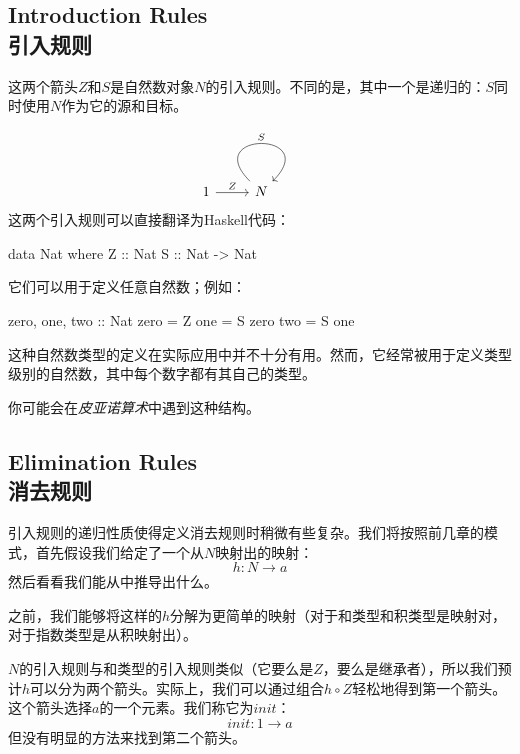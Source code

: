 \documentclass[DaoFP]{subfiles}
\begin{document}
    \subsection{Introduction Rules\\引入规则}

    这两个箭头$Z$和$S$是自然数对象$N$的引入规则。不同的是，其中一个是递归的：$S$同时使用$N$作为它的源和目标。

    \[
        \begin{tikzcd}
            1
            \arrow[r, "Z"]
            &N
            \arrow[out=135, in=45, loop, "S"]
        \end{tikzcd}
    \]
    这两个引入规则可以直接翻译为Haskell代码：

    \begin{haskell}
        data Nat where
        Z :: Nat
        S :: Nat -> Nat
    \end{haskell}
    它们可以用于定义任意自然数；例如：

    \begin{haskell}
        zero, one, two :: Nat
        zero = Z
        one  = S zero
        two  = S one
    \end{haskell}

    这种自然数类型的定义在实际应用中并不十分有用。然而，它经常被用于定义类型级别的自然数，其中每个数字都有其自己的类型。

    你可能会在\emph{皮亚诺算术}中遇到这种结构。

    \subsection{Elimination Rules\\消去规则}

    引入规则的递归性质使得定义消去规则时稍微有些复杂。我们将按照前几章的模式，首先假设我们给定了一个从$N$映射出的映射：
    \[ h \colon N \to a \]
    然后看看我们能从中推导出什么。

    之前，我们能够将这样的$h$分解为更简单的映射（对于和类型和积类型是映射对，对于指数类型是从积映射出）。

    $N$的引入规则与和类型的引入规则类似（它要么是$Z$，要么是继承者），所以我们预计$h$可以分为两个箭头。实际上，我们可以通过组合$h \circ Z$轻松地得到第一个箭头。这个箭头选择$a$的一个元素。我们称它为$\mathit{init}$：
    \[\mathit{init} \colon 1 \to a \]
    但没有明显的方法来找到第二个箭头。
\end{document}
